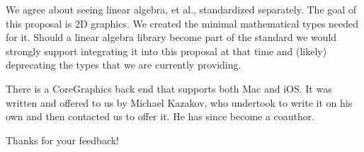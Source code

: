 \pnum
We agree about seeing linear algebra, et al., standardized separately. The goal of this proposal is 2D graphics. We created the minimal mathematical types needed for it. Should a linear algebra library become part of the standard we would strongly support integrating it into this proposal at that time and (likely) deprecating the types that we are currently providing.

\pnum
There is a CoreGraphics back end that supports both Mac and iOS. It was written and offered to us by Michael Kazakov, who undertook to write it on his own and then contacted us to offer it. He has since become a coauthor.

\pnum
Thanks for your feedback!
